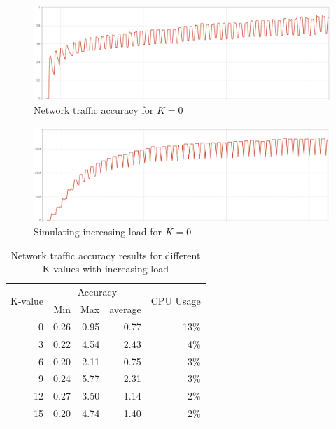 \begin{figure}
    \centering
    \includegraphics[width=\textwidth]{gfx/traffic_network_accuracy}
    \caption{Network traffic accuracy for $K = 0$}
    \label{fig:network_traffic_accuracy}
\end{figure}

\begin{figure}
    \centering
    \includegraphics[width=\textwidth]{gfx/increasing_load}
    \caption{Simulating increasing load for $K = 0$}
    \label{fig:increasing_load}
\end{figure}

\begin{table}[ht]
    \centering
    \begin{tabular}{r|rrr|r}
        \multirow{2}{*}{K-value} & \multicolumn{3}{c|}{Accuracy} & \multirow{2}{*}{CPU Usage} \\
        & Min & Max & average & \\ \hline  
        0 & 0.26& 0.95& 0.77& 13\% \\
        3 & 0.22& 4.54& 2.43& 4\% \\
        6 & 0.20& 2.11& 0.75& 3\% \\
        9 & 0.24& 5.77& 2.31& 3\% \\
        12& 0.27& 3.50& 1.14& 2\% \\
        15& 0.20& 4.74& 1.40& 2\% \\        
    \end{tabular}
    \caption{Network traffic accuracy results for different K-values with increasing load}
    \label{tab:accuracy_results}
\end{table}

